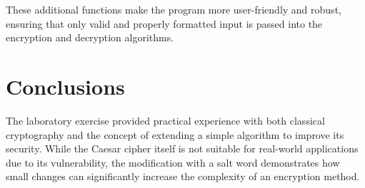 \documentclass[12pt]{article}
\begin{document}
These additional functions make the program more user-friendly and robust, ensuring that 
only valid and properly formatted input is passed into the encryption and decryption algorithms.



\section*{Conclusions}
\hspace{0.8cm} 
The laboratory exercise provided practical experience with both classical cryptography and the 
concept of extending a simple algorithm to improve its security. While the Caesar cipher itself 
is not suitable for real-world applications due to its vulnerability, the modification with a salt word 
demonstrates how small changes can significantly increase the complexity of an encryption method.
\end{document}
